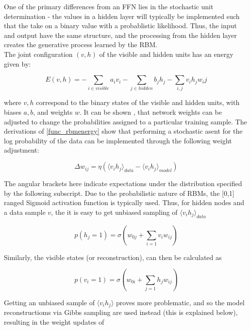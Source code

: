 \documentclass[a4paper,latin]{paper}
\begin{document}
One of the primary differences from an FFN lies in the stochastic unit determination - the values in a hidden layer will typically be implemented such that the take on a binary value with a probablistic likelihood. Thus, the input and output have the same structure, and the processing from the hidden layer creates the generative process learned by the RBM. 
~\\
The joint configuration $(v,h)$ of the visible and hidden units has an energy  given by:

\begin{equation}\label{func_rbmenergy}
E(v,h) = - \sum_{i \in visible} a_iv_i - \sum_{j \in hidden} b_jh_j - \sum_{i,j}v_ih_jw_ij
\end{equation}

where $v,h$ correspond to the binary states of the visible and hidden units, with biases $a,b$, and weights $w$. It can be shown , that network weights can be adjusted to change the probabilities assigned to a particular training sample. The derivations of \ref{func_rbmenergy} show that performing a stochastic asent for the log probability of the data can be implemented through the following weight adjustment:

\begin{equation}
\Delta w_{ij} = \eta (\langle v_ih_j\rangle_{data} - \langle v_ih_j\rangle_{model})
\end{equation}

The angular brackets here indicate expectations under the distribution specified by the following subscript. Due to the probabilistic nature of RBMs, the [0,1] ranged Sigmoid activation function is typically used. Thus, for hidden nodes and a data sample $v$, the it is easy to get unbiased sampling of $\langle v_ih_j \rangle_{data}$

\begin{equation}
p(h_j=1) = \sigma(w_{0j} +  \sum_{i=1}v_iw_{ij})
\end{equation}

Similarly, the visible states (or reconstruction), can then be calculated as 

\begin{equation}
p(v_i=1) = \sigma(w_{0i} + \sum_{j=1}h_jw_{ij})
\end{equation}


Getting an unbiased sample of $\langle v_i h_j \rangle$ proves more problematic, and so the model reconstructioms via Gibbs sampling are used instead (this is explained below), resulting in the weight updates of
\end{document}
